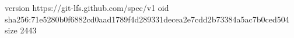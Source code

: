 version https://git-lfs.github.com/spec/v1
oid sha256:71e5280b0f6882cd0aad1789f4d289331decea2e7cdd2b73384a5ac7b0ced504
size 2443
